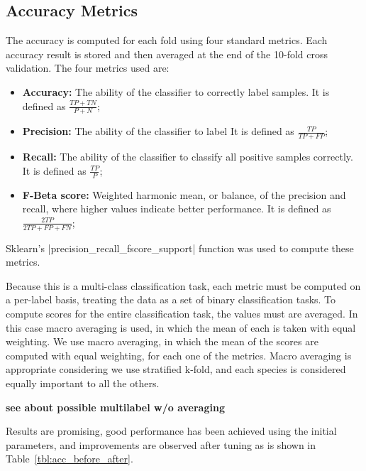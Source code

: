 \subsection{Accuracy Metrics}
The accuracy is computed for each fold using four standard metrics.
Each accuracy result is stored and then averaged at the end of the 10-fold
cross validation.
The four metrics used are:
\begin{itemize}
  \item \textbf{Accuracy:}
    The ability of the classifier to correctly label samples.
    It is defined as $\frac{TP+TN}{P+N}$;

  \item \textbf{Precision:}
    The ability of the classifier to label 
    It is defined as $\frac{TP}{TP+FP}$;

  \item \textbf{Recall:}
    The ability of the classifier to classify all positive samples correctly.
    It is defined as $\frac{TP}{P}$;

  \item \textbf{F-Beta score:}
    Weighted harmonic mean, or balance, of the precision and recall, where
    higher values indicate better performance.
    It is defined as $\frac{2TP}{2TP+FP+FN}$;
\end{itemize}

Sklearn's |precision_recall_fscore_support| function was used to compute these
metrics.

Because this is a multi-class classification task, each metric must be computed
on a per-label basis, treating the data as a set of binary classification tasks.
To compute scores for the entire classification task, the values must are averaged.
In this case macro averaging is used, in which the mean of each is taken with
equal weighting.
We use macro averaging, in which the mean of the scores are computed with equal
weighting, for each one of the metrics.
Macro averaging is appropriate considering we use stratified k-fold, and each
species is considered equally important to all the others.

\textbf{see about possible multilabel w/o averaging}

Results are promising, good performance has been achieved using the initial
parameters, and improvements are observed after tuning as is shown in
Table~\ref{tbl:acc_before_after}.

